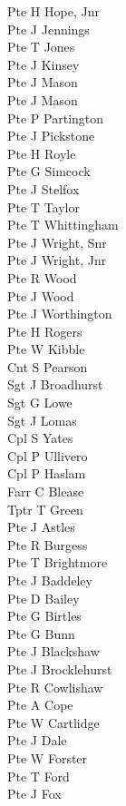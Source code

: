 \begin{multicols}{2}
  Pte H Hope, Jnr \\
  Pte J Jennings \\
  Pte T Jones \\
  Pte J Kinsey \\
  Pte J Mason \\
  Pte J Mason \\
  Pte P Partington \\
  Pte J Pickstone \\
  Pte H Royle \\
  Pte G Simcock \\
  Pte J Stelfox \\
  Pte T Taylor \\
  Pte T Whittingham \\
  Pte J Wright, Snr \\
  Pte J Wright, Jnr \\
  Pte R Wood \\
  Pte J Wood \\
  Pte J Worthington \\
  Pte H Rogers \\
  Pte W Kibble \\
  Cnt S Pearson \\
  Sgt J Broadhurst \\
  Sgt G Lowe \\
  Sgt J Lomas \\
  Cpl S Yates \\
  Cpl P Ullivero \\
  Cpl P Haslam \\
  Farr C Blease \\
  Tptr T Green \\
  Pte J Astles \\
  Pte R Burgess \\
  Pte T Brightmore \\
  Pte J Baddeley \\
  Pte D Bailey \\
  Pte G Birtles \\
  Pte G Bunn \\
  Pte J Blackshaw \\
  Pte J Brocklehurst \\
  Pte R Cowlishaw \\
  Pte A Cope \\
  Pte W Cartlidge \\
  Pte J Dale \\
  Pte W Forster \\
  Pte T Ford \\
  Pte J Fox \\

\end{multicols}
